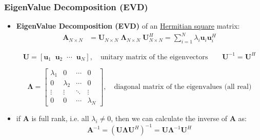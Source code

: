 \subsubsection{EigenValue Decomposition (EVD)}
\begin{itemize}
    \item \textbf{EigenValue Decomposition (EVD)} of an \underline{Hermitian square} matrix:
\begin{align*}
\mathbf{A}_{N \times N} 
&= \mathbf{U}_{N \times N} \; \mathbf{\Lambda}_{N \times N} \; \mathbf{U}^{H}_{N \times N}
= \sum_{i=1}^{N} \lambda_i \mathbf{u}_i \mathbf{u}_i^{H}
\end{align*}

\[
\mathbf{U} = [\mathbf{u}_1 \;\; \mathbf{u}_2 \;\; \cdots \;\; \mathbf{u}_N], \quad 
\text{unitary matrix of the eigenvectors}
\qquad
\mathbf{U}^{-1} = \mathbf{U}^{H}
\]

\[
\mathbf{\Lambda}
= \begin{bmatrix}
\lambda_1 & 0 & \cdots & 0 \\
0 & \lambda_2 & \cdots & 0 \\
\vdots & \vdots & \ddots & \vdots \\
0 & 0 & \cdots & \lambda_N
\end{bmatrix},
\quad
\text{diagonal matrix of the eigenvalues (all real)}
\]
    \item if \textbf{A} is full rank, i.e. all \(\lambda_i\neq0\), then we can calculate the inverse of \textbf{A} as:
    \[
\mathbf{A}^{-1}
= \left( \mathbf{U} \mathbf{\Lambda} \mathbf{U}^{H} \right)^{-1}
= \mathbf{U} \mathbf{\Lambda}^{-1} \mathbf{U}^{H}
\]
\end{itemize}

